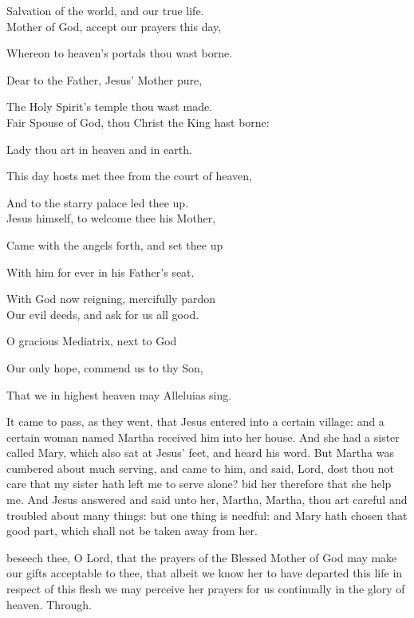 \begin{multicols}{2}
\begin{hangparas}{1.25em}{1}
Salvation of the world, and our true life.\\

Mother of God, accept our prayers this day,

Whereon to heaven's portals thou wast borne.

Dear to the Father, Jesus' Mother pure,

The Holy Spirit's temple thou wast made.\\

Fair Spouse of God, thou Christ the King hast borne:

Lady thou art in heaven and in earth.

This day hosts met thee from the court of heaven,

And to the starry palace led thee up.\\

Jesus himself, to welcome thee his Mother,

Came with the angels forth, and set thee up

With him for ever in his Father's seat.

With God now reigning, mercifully pardon\\

Our evil deeds, and ask for us all good.

O gracious Mediatrix, next to God

Our only hope, commend us to thy Son,

That we in highest heaven may Alleluias sing.
\end{hangparas}
\end{multicols}

 It came to pass, as they went, that Jesus entered into a certain village: and a certain woman named Martha received him into her house. And she had a sister called Mary, which also sat at Jesus' feet, and heard his word. But Martha was cumbered about much serving, and came to him, and said, Lord, dost thou not care that my sister hath left me to serve alone? bid her therefore that she help me. And Jesus answered and said unto her, Martha, Martha, thou art careful and troubled about many things: but one thing is needful: and Mary hath chosen that good part, which shall not be taken away from her.


\secret
{} beseech thee, O Lord, that the prayers of the Blessed Mother of God may make our gifts acceptable to thee, that albeit we know her to have departed this life in respect of this flesh we may perceive her prayers for us continually in the glory of heaven. Through.

